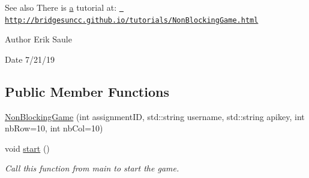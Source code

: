 \begin{DoxySeeAlso}{See also}
There is \mbox{\hyperlink{namespacebridges_1_1game_ab9a19c7ab6e2ebac2f95180e21733487a0cc175b9c0f1b6a831c399e269772661}{a}} tutorial at\+: \href{http://bridgesuncc.github.io/tutorials/NonBlockingGame.html}{\texttt{ http\+://bridgesuncc.\+github.\+io/tutorials/\+Non\+Blocking\+Game.\+html}}
\end{DoxySeeAlso}
\begin{DoxyAuthor}{Author}
Erik Saule 
\end{DoxyAuthor}
\begin{DoxyDate}{Date}
7/21/19 
\end{DoxyDate}
\subsection*{Public Member Functions}
\begin{DoxyCompactItemize}
\item 
\mbox{\hyperlink{classbridges_1_1game_1_1_non_blocking_game_a3226aa7e7ff129e916f4bd5aabcb2e72}{Non\+Blocking\+Game}} (int assignment\+ID, std\+::string username, std\+::string apikey, int nb\+Row=10, int nb\+Col=10)
\item 
void \mbox{\hyperlink{classbridges_1_1game_1_1_non_blocking_game_ab48a0d690368bb8ff7b02aad0b6f336e}{start}} ()
\begin{DoxyCompactList}\small\item\em Call this function from main to start the game. \end{DoxyCompactList}\end{DoxyCompactItemize}
